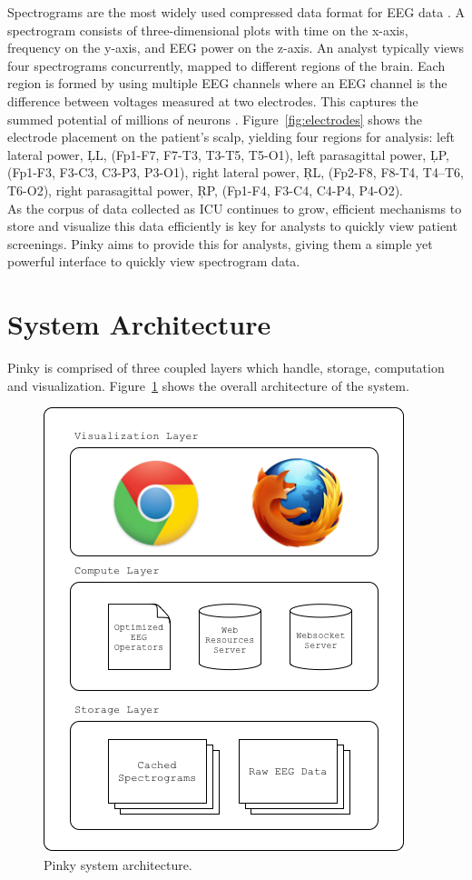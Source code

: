 Spectrograms are the most widely used compressed data format for EEG data
\cite{ceeg-1}. A spectrogram consists of three-dimensional plots with time on
the x-axis, frequency on the y-axis, and EEG power on the z-axis. An analyst
typically views four spectrograms concurrently, mapped to different regions of
the brain. Each region is formed by using multiple EEG channels where an EEG
channel is the difference between voltages measured at two electrodes. This
captures the summed potential of millions of neurons \cite{eeg-ml}.
Figure~\ref{fig:electrodes} shows the electrode placement on the patient's
scalp, yielding four regions for analysis: left lateral power, \c{LL}, (Fp1-F7,
F7-T3, T3-T5, T5-O1), left parasagittal power, \c{LP}, (Fp1-F3, F3-C3, C3-P3,
P3-O1), right lateral power, \c{RL}, (Fp2-F8, F8-T4, T4–T6, T6-O2), right
parasagittal power, \c{RP}, (Fp1-F4, F3-C4, C4-P4, P4-O2).  \\

As the corpus of data collected as ICU continues to grow, efficient mechanisms
to store and visualize this data efficiently is key for analysts to quickly
view patient screenings. Pinky aims to provide this for analysts, giving them a
simple yet powerful interface to quickly view spectrogram data.

\section{System Architecture}

Pinky is comprised of three coupled layers which handle, storage, computation
and visualization. Figure~\ref{fig:system-architecture} shows the overall
architecture of the system.

\begin{figure}[h]
\begin{center}
\includegraphics[scale=0.75]{./img/system-architecture.png}
\caption{Pinky system architecture.}
\label{fig:system-architecture}
\end{center}
\end{figure}

